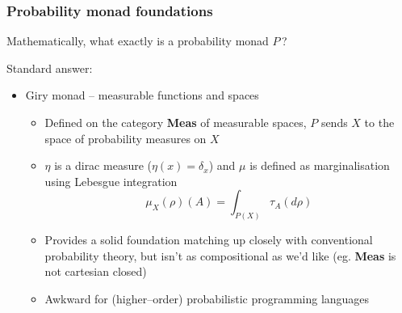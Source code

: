\documentclass[mathserif,handout]{beamer}
\begin{document}

\begin{frame}
  \frametitle{Probability monad foundations}
  Mathematically, what \alert{exactly} is a probability monad $P$\,?

  Standard answer:
  
  \begin{itemize}
  \item \alert{Giry monad} --  measurable functions and spaces
    \begin{itemize}
      \item Defined on the category \textbf{Meas} of measurable spaces, $P$ sends $X$ to the space of probability measures on $X$
      \item $\eta$ is a dirac measure ($\eta(x) = \delta_x$) and $\mu$ is defined as marginalisation using Lebesgue integration
        \[
\mu_X(\rho)(A) = \int_{P(X)} \tau_A(d\rho)
        \]
      \item Provides a solid foundation matching up closely with conventional probability theory, but isn't as compositional as we'd like (eg. \textbf{Meas} is not cartesian closed)
        \item Awkward for (higher--order) probabilistic programming languages
    \end{itemize}
  \end{itemize}
\end{frame}
\end{document}
